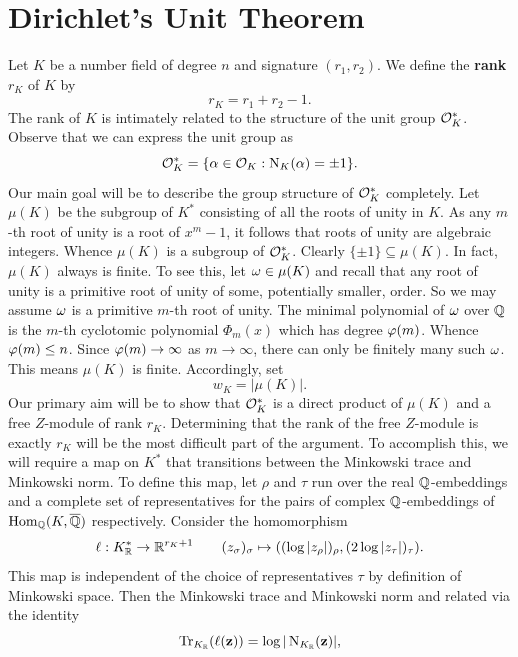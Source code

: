   \section{Dirichlet's Unit Theorem}
    Let \(K\) be a number field of degree \(n\) and signature \((r_{1},r_{2})\). We define the \textbf{rank} \(r_{K}\) of \(K\) by
    \[
      r_{K} = r_{1}+r_{2}-1.
    \]
    The rank of \(K\) is intimately related to the structure of the unit group \(\mathcal{O}_{K}^{\ast}\). Observe that we can express the unit group as
    \[
      \mathcal{O}_{K}^{\ast} = \{\alpha \in \mathcal{O}_{K}:\operatorname{\mathrm{N}}_{K}(\alpha) = \pm 1\}.
    \]
    Our main goal will be to describe the group structure of \(\mathcal{O}_{K}^{\ast}\) completely. Let \(\mu(K)\) be the subgroup of \(K^{\ast}\) consisting of all the roots of unity in \(K\). As any \(m\)-th root of unity is a root of \(x^{m}-1\), it follows that roots of unity are algebraic integers. Whence \(\mu(K)\) is a subgroup of \(\mathcal{O}_{K}^{\ast}\). Clearly \(\{\pm 1\} \subseteq \mu(K)\). In fact, \(\mu(K)\) always is finite. To see this, let \(\omega \in \mu(K)\) and recall that any root of unity is a primitive root of unity of some, potentially smaller, order. So we may assume \(\omega\) is a primitive \(m\)-th root of unity. The minimal polynomial of \(\omega\) over \(\mathbb{Q}\) is the \(m\)-th cyclotomic polynomial \(\Phi_{m}(x)\) which has degree \(\varphi(m)\). Whence \(\varphi(m) \le n\). Since \(\varphi(m) \to \infty\) as \(m \to \infty\), there can only be finitely many such \(\omega\). This means \(\mu(K)\) is finite. Accordingly, set
    \[
      w_{K} = |\mu(K)|.
    \]
    Our primary aim will be to show that \(\mathcal{O}_{K}^{\ast}\) is a direct product of \(\mu(K)\) and a free \(Z\)-module of rank \(r_{K}\). Determining that the rank of the free \(Z\)-module is exactly \(r_{K}\) will be the most difficult part of the argument. To accomplish this, we will require a map on \(K^{\ast}\) that transitions between the Minkowski trace and Minkowski norm. To define this map, let \(\rho\) and \(\tau\) run over the real \(\mathbb{Q}\)-embeddings and a complete set of representatives for the pairs of complex \(\mathbb{Q}\)-embeddings of \(\operatorname{\mathrm{Hom}}_{\mathbb{Q}}(K,\overline{\mathbb{Q}})\) respectively. Consider the homomorphism 
    \[
      \ell:K_{\mathbb{R}}^{\ast} \to \mathbb{R}^{r_{K}+1} \qquad (z_{\sigma})_{\sigma} \mapsto ((\log|z_{\rho}|)_{\rho},(2\log|z_{\tau}|)_{\tau}).
    \]
    This map is independent of the choice of representatives \(\tau\) by definition of Minkowski space. Then the Minkowski trace and Minkowski norm and related via the identity
    \[
      \operatorname{\mathrm{Tr}}_{K_{\mathbb{R}}}(\ell(\mathbf{z})) = \log|\operatorname{\mathrm{N}}_{K_{\mathbb{R}}}(\mathbf{z})|,
    \]
